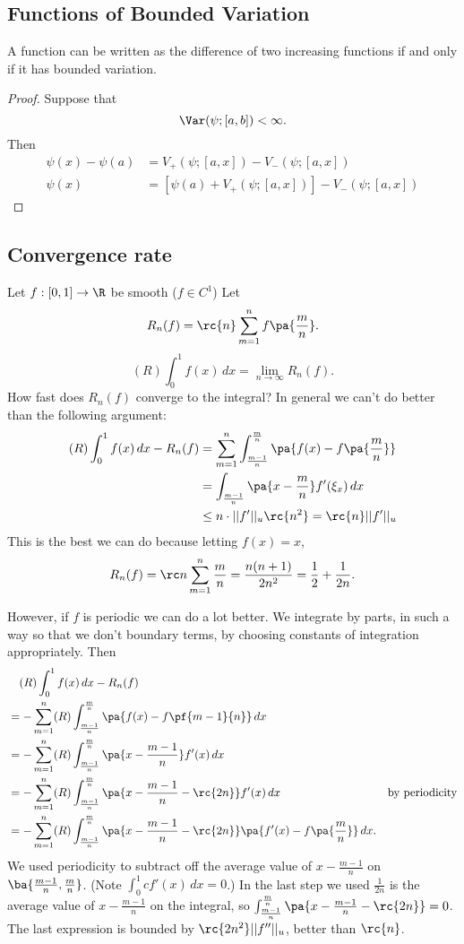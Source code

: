 
\subsection{Functions of Bounded Variation}
\begin{thm}
A function can be written as the difference of two increasing functions if and only if it has bounded variation.
\end{thm}
\begin{proof}
Suppose that
\[
\Var(\psi;[a,b])<\infty.
\]
Then 
\begin{align*}
\psi(x)-\psi(a)&=V_+(\psi;[a,x])-V_-(\psi;[a,x])\\
\psi(x)&=[\psi(a)+V_+(\psi;[a,x])]-V_-(\psi;[a,x])%
\end{align*}
\end{proof}
\subsection{Convergence rate}
Let $f:[0,1]\to \R$ be smooth ($f\in C^1$)
Let
\[
R_n(f)=\rc{n} \sum_{m=1}^n f\pa{\frac mn}.
\]
\[
(R)\int_0^1 f(x)\,dx=\lim_{n\to \infty} R_n(f).
\]
How fast does $R_n(f)$ converge to the integral? In general we can't do better than the following argument:
\begin{align*}
(R)\int_0^1 f(x)\,dx- R_n(f)&=\sum_{m=1}^n \int_{\frac{m-1}{n}}^{\frac mn} \pa{f(x)-f\pa{\frac mn}}\\
&=\int_{\frac{m-1}{n}} \pa{x-\frac mn}f'(\xi_x)\,dx\\
&\leq n\cdot ||f'||_u\rc{n^2}=\rc{n}||f'||_u
\end{align*}
This is the best we can do because letting $f(x)=x$,
\[
R_n(f)=\rc n\sum_{m=1}^n \frac mn=\frac{n(n+1)}{2n^2}=\frac{1}{2}+\frac{1}{2n}.
\]

However, if $f$ is periodic we can do a lot better. We integrate by parts, in such a way so that we don't boundary terms, by choosing constants of integration appropriately. Then
\begin{align*}
&\quad (R)\int_0^1 f(x)\,dx-R_n(f)\\
&=-\sum_{m=1}^n (R)\int_{\frac{m-1}{n}}^{\frac mn} \pa{f(x)-f\pf{m-1}{n}}\,dx\\
&=-\sum_{m=1}^n (R)\int_{\frac{m-1}{n}}^{\frac mn} \pa{x-\frac{m-1}{n}}f'(x)\,dx\\
&=-\sum_{m=1}^n (R)\int_{\frac{m-1}{n}}^{\frac mn} \pa{x-\frac{m-1}{n}-\rc{2n}}f'(x)\,dx&\text{by periodicity}\\
&=-\sum_{m=1}^n (R)\int_{\frac{m-1}{n}}^{\frac mn} \pa{x-\frac{m-1}{n}-\rc{2n}}\pa{f'(x)-f\pa{\frac mn}}\,dx.
\end{align*}
We used periodicity to subtract off the average value of $x-\frac{m-1}{n}$ on $\ba{\frac{m-1}{n},{\frac mn}}$. (Note $\int_0^1cf'(x)\,dx=0$.) In the last step we used $\frac{1}{2n}$ is the average value of $x-\frac{m-1}{n}$ on the integral, so $\int_{\frac{m-1}{n}}^{\frac mn} \pa{x-\frac{m-1}{n}-\rc{2n}}=0$.
The last expression is bounded by $\rc{2n^2}||f''||_u$, better than $\rc{n}$.

